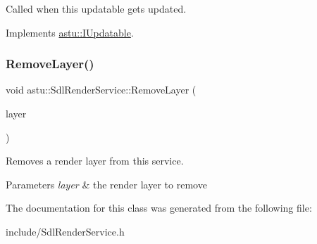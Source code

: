 Called when this updatable gets updated. 

Implements \hyperlink{classastu_1_1IUpdatable_a76c7c6e2a71b725bbdbdf6808ef4743f}{astu\+::\+I\+Updatable}.

\mbox{\label{classastu_1_1SdlRenderService_a88ffe81ca6348b12b0185310932bd4ee}} 
\subsubsection{\texorpdfstring{Remove\+Layer()}{RemoveLayer()}}
{\footnotesize\ttfamily void astu\+::\+Sdl\+Render\+Service\+::\+Remove\+Layer (\begin{DoxyParamCaption}\item[{std\+::shared\+\_\+ptr$<$ \hyperlink{classastu_1_1ISdlRenderLayer}{I\+Sdl\+Render\+Layer} $>$}]{layer }\end{DoxyParamCaption})}

Removes a render layer from this service.


\begin{DoxyParams}{Parameters}
{\em layer} & the render layer to remove \\
\hline
\end{DoxyParams}


The documentation for this class was generated from the following file\+:\begin{DoxyCompactItemize}
\item 
include/Sdl\+Render\+Service.\+h\end{DoxyCompactItemize}

